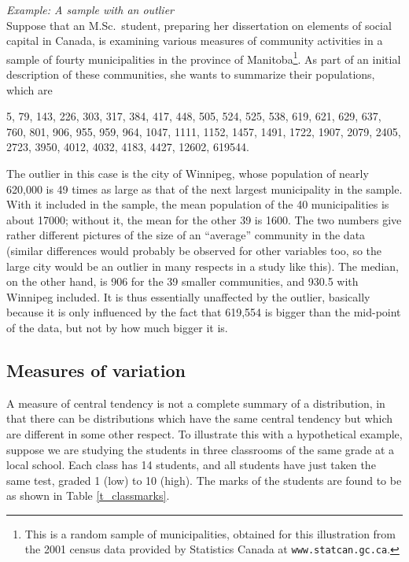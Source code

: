 \emph{Example: A sample with an outlier}\\
Suppose that an M.Sc.\ student, preparing her dissertation on elements
of social capital in Canada, is examining various measures of community
activities in a sample of fourty municipalities in the province of
Manitoba\footnote{This is a random sample of municipalities,
obtained for this illustration from the 2001 census data provided by
Statistics Canada at \texttt{www.statcan.gc.ca}.}. As part of an initial
description of these communities, she wants to summarize their
populations, which are

5, 79, 143, 226, 303, 317, 384, 417, 448, 505, 524, 525, 538, 619, 621,
629, 637, 760, 801, 906, 955, 959, 964, 1047, 1111, 1152, 1457, 1491,
1722, 1907, 2079, 2405, 2723, 3950, 4012, 4032, 4183, 4427, 12602,
619544.

The outlier in this case is the city of Winnipeg, whose population of
nearly 620,000 is 49 times as large as that of the next largest
municipality in the sample. With it included in the sample, the mean
population of the 40 municipalities is about 17000; without it, the
mean for the other 39 is 1600. The two numbers give rather different
pictures of the size of an ``average'' community in the data (similar
differences would probably be observed for other variables too, so the
large city would be an outlier in many respects in a
study like this). The median, on the other hand, is 906 for the 39
smaller communities, and 930.5 with Winnipeg included. It is thus
essentially unaffected by the outlier, basically because it is only
influenced by the fact that 619,554 is bigger than the mid-point of the
data, but not by how much bigger it is.

\subsection{Measures of variation}
\label{ss_descr1_nums_variation}

A measure of central tendency is not a complete summary of a
distribution, in that there can be distributions which have the same
central tendency but which are different in some other respect. To
illustrate this with a hypothetical example,
suppose we are studying the students in three classrooms of the same
grade at a local school. Each class has 14 students, and all students
have just taken the same test, graded 1 (low) to 10 (high).
The marks of the students are found to be as shown in Table
\ref{t_classmarks}.


